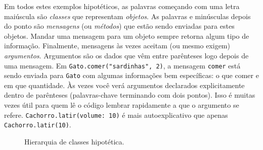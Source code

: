 Em todos estes exemplos hipotéticos, as palavras começando com uma letra maiúscula são \emph{classes} que representam \emph{objetos}. As palavras e minúsculas depois do ponto são \emph{mensagens} (ou \emph{métodos}) que estão sendo enviadas para estes objetos. Mandar uma mensagem para um objeto sempre retorna algum tipo de informação. Finalmente, mensagens às vezes aceitam (ou mesmo exigem) \emph{argumentos}. Argumentos são os dados que vêm entre parênteses logo depois de uma mensagem. Em \texttt{Gato.comer("sardinhas", 2)}, a mensagem \texttt{comer} está sendo enviada para \texttt{Gato} com algumas informações bem específicas: o que comer e em que quantidade. Às vezes você verá argumentos declarados explicitamente dentro de parênteses (palavras-chave terminando com dois pontos). Isso é muitas vezes útil para quem lê o código lembrar rapidamente a que o argumento se refere. \texttt{Cachorro.latir(volume: 10)} é mais autoexplicativo que apenas \texttt{Cachorro.latir(10)}.

\begin{figure}[h]
\centerline{}
\caption{Hierarquia de classes hipotética.}
\label{fig:animal-class-chart}
\end{figure}

